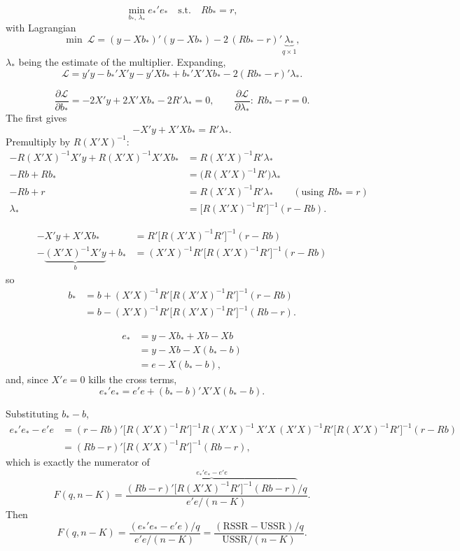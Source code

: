 \documentclass[11pt]{article}
\begin{document}
\[ \min_{b_{*},\,\lambda_{*}} e_{*}'e_{*} \quad\text{s.t.}\quad Rb_{*} = r, \]
with Lagrangian
\[ \min \ \mathcal{L} = (y - Xb_{*})'(y - Xb_{*}) - 2\,(Rb_{*} - r)'\underbrace{\lambda_{*}}_{q\times1}, \]
$\lambda_{*}$ being the estimate of the multiplier. Expanding,
\[ \mathcal{L} = y'y - b_{*}'X'y - y'Xb_{*} + b_{*}'X'Xb_{*} - 2(Rb_{*} - r)'\lambda_{*}. \]

\[ \frac{\partial\mathcal{L}}{\partial b_{*}} = -2X'y + 2X'Xb_{*} - 2R'\lambda_{*} = 0,
   \qquad
   \frac{\partial\mathcal{L}}{\partial \lambda_{*}}:\ Rb_{*} - r = 0. \]
The first gives
\[ -X'y + X'Xb_{*} = R'\lambda_{*}. \]
Premultiply by $R(X'X)^{-1}$:
\[
\begin{aligned}
-R(X'X)^{-1}X'y + R(X'X)^{-1}X'Xb_{*} &= R(X'X)^{-1}R'\lambda_{*}\\
-Rb + Rb_{*} &= \bigl(R(X'X)^{-1}R'\bigr)\lambda_{*}\\
-Rb + r &= R(X'X)^{-1}R'\lambda_{*} \qquad (\text{using } Rb_{*} = r)\\
\lambda_{*} &= \bigl[R(X'X)^{-1}R'\bigr]^{-1}(r - Rb).
\end{aligned}
\]

\[
\begin{aligned}
-X'y + X'Xb_{*} &= R'\bigl[R(X'X)^{-1}R'\bigr]^{-1}(r - Rb)\\
-\underbrace{(X'X)^{-1}X'y}_{b} + b_{*} &= (X'X)^{-1}R'\bigl[R(X'X)^{-1}R'\bigr]^{-1}(r - Rb)
\end{aligned}
\]
so
\[
\begin{aligned}
b_{*} &= b + (X'X)^{-1}R'\bigl[R(X'X)^{-1}R'\bigr]^{-1}(r - Rb)\\
      &= b - (X'X)^{-1}R'\bigl[R(X'X)^{-1}R'\bigr]^{-1}(Rb - r).
\end{aligned}
\]

\[
\begin{aligned}
e_{*} &= y - Xb_{*} + Xb - Xb\\
      &= y - Xb - X(b_{*} - b)\\
      &= e - X(b_{*} - b),
\end{aligned}
\]
and, since $X'e = 0$ kills the cross terms,
\[ e_{*}'e_{*} = e'e + (b_{*} - b)'X'X(b_{*} - b). \]

Substituting $b_{*} - b$,
\[
\begin{aligned}
e_{*}'e_{*} - e'e
 &= (r - Rb)'\bigl[R(X'X)^{-1}R'\bigr]^{-1}R(X'X)^{-1}\,X'X\,(X'X)^{-1}R'\bigl[R(X'X)^{-1}R'\bigr]^{-1}(r - Rb)\\
 &= (Rb - r)'\bigl[R(X'X)^{-1}R'\bigr]^{-1}(Rb - r),
\end{aligned}
\]
which is exactly the numerator of
\[ F(q, n - K) = \frac{\overbrace{(Rb - r)'\bigl[R(X'X)^{-1}R'\bigr]^{-1}(Rb - r)}^{e_{*}'e_{*} - e'e}/q}{e'e/(n - K)}. \]
Then
\[ F(q, n - K) = \frac{(e_{*}'e_{*} - e'e)/q}{e'e/(n - K)}
   = \frac{(\text{RSSR} - \text{USSR})/q}{\text{USSR}/(n - K)}. \]
\end{document}
